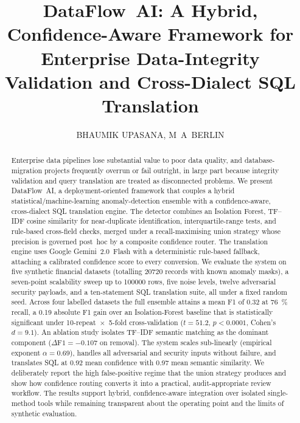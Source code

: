 \documentclass{ieeeaccess}
\begin{document}

\title{DataFlow~AI: A Hybrid, Confidence-Aware Framework for Enterprise Data-Integrity Validation and Cross-Dialect SQL Translation}

\author{
  \uppercase{Bhaumik Upasana},
  \uppercase{M~A~Berlin}
}

\address[1,2]{School of Computer Science and Engineering (SCOPE), Vellore Institute of Technology (VIT), Vellore, Tamil Nadu 632 014, India}


\begin{abstract}
Enterprise data pipelines lose substantial value to poor data quality, and database-migration projects frequently overrun
or fail outright, in large part because integrity validation and query translation are treated as disconnected problems.
We present DataFlow~AI, a deployment-oriented framework that couples a hybrid statistical/machine-learning anomaly-detection
ensemble with a confidence-aware, cross-dialect SQL translation engine. The detector combines an Isolation Forest, TF--IDF
cosine similarity for near-duplicate identification, interquartile-range tests, and rule-based cross-field checks, merged
under a recall-maximising union strategy whose precision is governed post~hoc by a composite confidence router. The
translation engine uses Google Gemini~2.0~Flash with a deterministic rule-based fallback, attaching a calibrated confidence
score to every conversion. We evaluate the system on five synthetic financial datasets (totalling \num{20720} records with
known anomaly masks), a seven-point scalability sweep up to \num{100000} rows, five noise levels, twelve adversarial
security payloads, and a ten-statement SQL translation suite, all under a fixed random seed. Across four labelled datasets
the full ensemble attains a mean F1 of \num{0.32} at \SI{76}{\percent} recall, a \num{+0.19} absolute F1 gain over an
Isolation-Forest baseline that is statistically significant under \mbox{10-repeat $\times$ 5-fold} cross-validation
($t=51.2$, $p<0.0001$, Cohen's $d=9.1$). An ablation study isolates TF--IDF semantic matching as the dominant component
($\Delta\mathrm{F1}=-0.107$ on removal). The system scales sub-linearly (empirical exponent $\alpha=0.69$), handles all
adversarial and security inputs without failure, and translates SQL at \num{0.92} mean confidence with \num{0.97} mean
semantic similarity. We deliberately report the high false-positive regime that the union strategy produces and show how
confidence routing converts it into a practical, audit-appropriate review workflow. The results support hybrid,
confidence-aware integration over isolated single-method tools while remaining transparent about the operating point and
the limits of synthetic evaluation.
\end{abstract}
\end{document}
